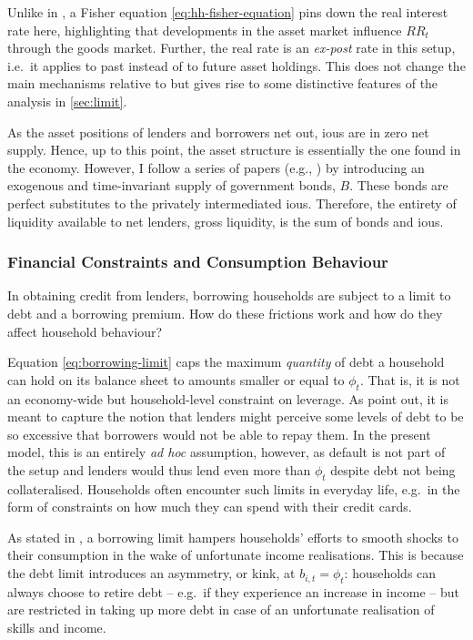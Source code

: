 \documentclass[a4paper,12pt]{article} %
\numberwithin{equation}{section} %
\numberwithin{figure}{section}
\numberwithin{table}{section}
\begin{document}
Unlike in \textcite{gl2017}, a Fisher equation \eqref{eq:hh-fisher-equation} pins down the real interest rate here, highlighting that developments in the asset market influence $RR_t$ through the goods market. Further, the real rate is an \textit{ex-post} rate in this setup, i.e.~it applies to past instead of to future asset holdings. This does not change the main mechanisms relative to \textcite{gl2017} but gives rise to some distinctive features of the analysis in \ref{sec:limit}.

As the asset positions of lenders and borrowers net out, \Gls{iou}s are in zero net supply. Hence, up to this point, the asset structure is essentially the one found in the \textcite{huggett1993} economy. However, I follow a series of papers (e.g.\cite{gl2017}, \cite{bayer2023}) by introducing an exogenous and time-invariant supply of government bonds, $B$. These bonds are perfect substitutes to the privately intermediated \Gls{iou}s. Therefore, the entirety of liquidity available to net lenders, gross liquidity, is the sum of bonds and \Gls{iou}s.

\subsubsection{Financial Constraints and Consumption Behaviour}
\label{sec:model-hh-constraints}

In obtaining credit from lenders, borrowing households are subject to a limit to debt and a borrowing premium. How do these frictions work and how do they affect household behaviour?

Equation \eqref{eq:borrowing-limit} caps the maximum \textit{quantity} of debt a household can hold on its balance sheet to amounts smaller or equal to $\phi_t$. That is, it is not an economy-wide but household-level constraint on leverage. As \textcite{egg2012} point out, it is meant to capture the notion that lenders might perceive some levels of debt to be so excessive that borrowers would not be able to repay them. In the present model, this is an entirely \textit{ad hoc} assumption, however, as default is not part of the setup and lenders would thus lend even more than $\phi_t$ despite debt not being collateralised. Households often encounter such limits in everyday life, e.g.~in the form of constraints on how much they can spend with their credit cards.

As stated in \textcite{carroll2021}, a borrowing limit hampers households' efforts to smooth shocks to their consumption in the wake of unfortunate income realisations. This is because the debt limit introduces an asymmetry, or kink, at $b_{i,t} = \phi_t$: households can always choose to retire debt -- e.g.~if they experience an increase in income -- but are restricted in taking up more debt in case of an unfortunate realisation of skills and income. 
\end{document}
